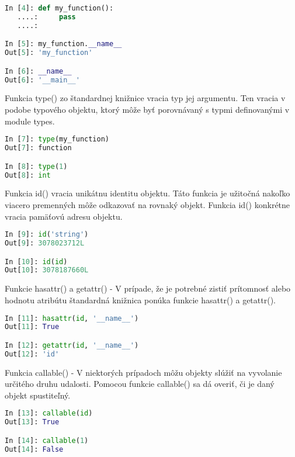 \documentclass[11pt,oneside,final]{fithesis2}
\begin{document}
\begin{list}{•}{}
\begin{lstlisting}[language=python]		
In [4]: def my_function():
   ....:     pass
   ....: 

In [5]: my_function.__name__
Out[5]: 'my_function'

In [6]: __name__
Out[6]: '__main__'
\end{lstlisting}

		\item 
		
		Funkcia type() zo štandardnej knižnice vracia typ jej argumentu. Ten vracia v podobe typového objektu, ktorý môže byť porovnávaný s typmi definovanými v module types.

\begin{lstlisting}[language=python]	
In [7]: type(my_function)
Out[7]: function

In [8]: type(1)
Out[8]: int
\end{lstlisting}


		\item 
		
		Funkcia id() vracia unikátnu identitu objektu. Táto funkcia je užitočná nakoľko viacero premenných môže odkazovať na rovnaký objekt. Funkcia id() konkrétne vracia pamäťovú adresu objektu.

\begin{lstlisting}[language=python]	
In [9]: id('string')
Out[9]: 3078023712L

In [10]: id(id)
Out[10]: 3078187660L
\end{lstlisting}

		\item Funkcie hasattr() a getattr() -
		V prípade, že je potrebné zistiť prítomnosť alebo hodnotu atribútu štandardná knižnica ponúka funkcie hasattr() a getattr().

\begin{lstlisting}[language=python]	
In [11]: hasattr(id, '__name__')
Out[11]: True

In [12]: getattr(id, '__name__')
Out[12]: 'id'
\end{lstlisting}		

		\item Funkcia callable() -
		V niektorých prípadoch môžu objekty slúžiť na vyvolanie určitého druhu udalosti. Pomocou funkcie callable() sa dá overiť, či je daný objekt spustiteľný.

\begin{lstlisting}[language=python]	
In [13]: callable(id)
Out[13]: True

In [14]: callable(1)
Out[14]: False
\end{lstlisting}			



\end{list}
\end{document}
